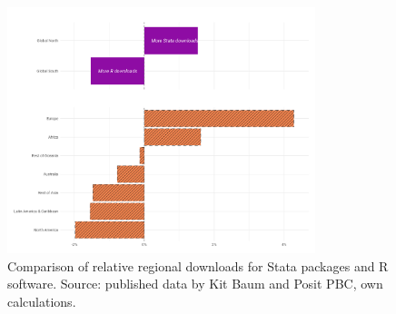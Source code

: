 
\begin{figure}
    \centering
    \includegraphics[width=0.8\textwidth]{outputs/compare_combined_diff_select.png}
    \caption{Comparison of relative regional downloads for Stata packages and R software. Source: published data by Kit Baum and Posit PBC, own calculations.}
    \label{fig:downloads}
\end{figure}
